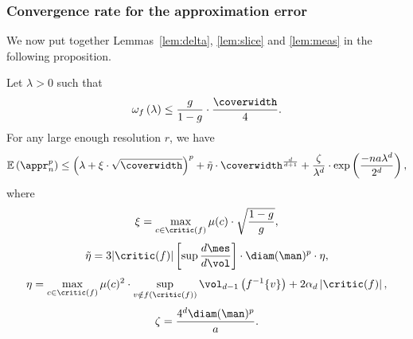 \subsubsection{Convergence rate for the approximation error}

 
We now put together Lemmas~\ref{lem:delta}, \ref{lem:slice} and \ref{lem:meas} in the following proposition.

 

\begin{proposition}\label{prop:apprx}
Let $\lambda>0$ such that
$$\omega_f\left(\lambda\right)\leq\frac{g}{1-g}\cdot\frac{\coverwidth}{4}.$$
For any large enough resolution $r$, we have
$$\mathbb{E}\left(\appr_n^p\right)\leq \left(\lambda+\xi\cdot\sqrt{\coverwidth}\right)^p
    +\tilde{\eta}\cdot\coverwidth^{\frac{d}{d+1}}+\frac{\zeta}{\lambda^d}\cdot\exp\left(\frac{-na\lambda^d}{2^d}\right),$$
    where
    $$\xi=\max_{c\in\critic(f)}\mu(c)\cdot\sqrt{\frac{1-g}{g}},$$
    $$\tilde{\eta}=3 |\critic(f)| \left[\sup\frac{d\mes}{d\vol}\right]\cdot\diam(\man)^p\cdot\eta,$$
    $$\eta=\max_{c\in\critic(f)}\mu(c)^2\cdot\sup_{v\notin f(\critic(f))}\vol_{d-1}\left(f^{-1}\{v\}\right)+2\alpha_d\left|\critic(f)\right|,$$
    $$\zeta=\frac{4^d\diam(\man)^p}{a}.$$

\end{proposition}

